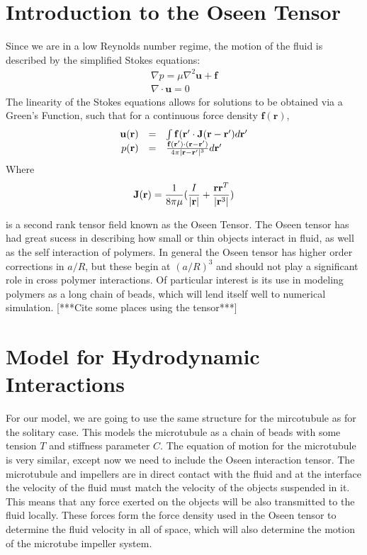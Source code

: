 \documentclass[11pt]{ucthesis}
\def\br{{\bf r}}
\begin{document}
{\section{Introduction to the Oseen Tensor}
Since we are in a low Reynolds number regime, the motion of the fluid is described by the simplified Stokes equations:
\begin{equation}
\begin{array}{l}
\nabla p = \mu \nabla^2 \mathbf{u} +  \mathbf{f} \\
\nabla \cdot  \mathbf{u} = 0
\end{array}
\end{equation}
The linearity of the Stokes equations allows for solutions to be obtained via a Green's Function, such that for a continuous force density $ \mathbf{f}( \mathbf{r})$,
\begin{equation}
\label{eq:fluidgreensfunc}
\begin{array}{rcl}
 \mathbf{u}(\br ) &=& \int  \mathbf{f}(\br^\prime \cdot  \mathbf{J} (\br - \br^\prime) d\br^\prime \\
p(\br) &=& \frac{ \mathbf{f}(\br^\prime) \cdot (\br - \br^\prime)}{4 \pi | \br - \br^\prime|^3} d\br^\prime
\end{array}
\end{equation}
Where 
\begin{equation}
\label{eq:oseentensordef}
 \mathbf{J}(\br) = \frac{1}{8\pi\mu} ( \frac{I}{|\br|} + \frac{\br\br^T}{|\br^3|})
\end{equation}

is a second rank tensor field known as the Oseen Tensor.
The Oseen tensor has had great sucess in describing how small or thin objects interact in fluid, as well as the self interaction of polymers. 
In general the Oseen tensor has higher order corrections in $a/R$, but these begin at $(a/R)^3$ and should not play a significant role in cross polymer interactions.
Of particular interest is its use in modeling polymers as a long chain of beads, which will lend itself well to numerical simulation.
[***Cite some places using the tensor***]

\section{Model for Hydrodynamic Interactions}
For our model, we are going to use the same structure for the mircotubule as for the solitary case. This models the microtubule as a chain of beads with some tension $T$ and stiffness parameter $C$. The equation of motion for the microtubule is very similar, except now we need to include the Oseen interaction tensor.
The microtubule and impellers are in direct contact with the fluid and at the interface the velocity of the fluid must match the velocity of the objects suspended in it.
This means that any force exerted on the objects will be also transmitted to the fluid locally. 
These forces form the force density used in the Oseen tensor to determine the fluid velocity in all of space, which will also determine the motion of the microtube impeller system.

}
\end{document}

